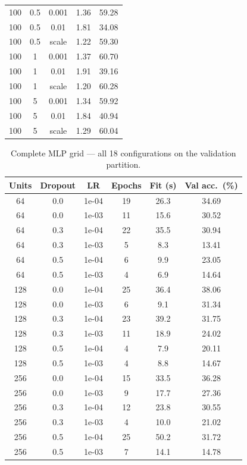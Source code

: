 \documentclass[../main.tex]{subfiles}
\begin{document}
\begin{table}[!htbp]
\begin{tabular}{ccccc}
        100 & 0.5 & 0.001 & 1.36 & 59.28 \\
        100 & 0.5 & 0.01 & 1.81 & 34.08 \\
        100 & 0.5 & scale & 1.22 & 59.30 \\
        100 & 1 & 0.001 & 1.37 & 60.70 \\
        100 & 1 & 0.01 & 1.91 & 39.16 \\
        100 & 1 & scale & 1.20 & 60.28 \\
        100 & 5 & 0.001 & 1.34 & 59.92 \\
        100 & 5 & 0.01 & 1.84 & 40.94 \\
        100 & 5 & scale & 1.29 & 60.04 \\
        \bottomrule
    \end{tabular}
\end{table}

\begin{table}[!htbp]
    \centering
    \caption{Complete MLP grid — all 18 configurations on the validation
    partition.}
    \label{tab.mlp-full}
    \begin{tabular}{cccccc}
        \toprule
        \textbf{Units} & \textbf{Dropout} & \textbf{LR} &
        \textbf{Epochs} & \textbf{Fit (s)} &
        \textbf{Val acc.\ (\%)} \\
        \midrule
        64 & 0.0 & 1e-04 & 19 & 26.3 & 34.69 \\
        64 & 0.0 & 1e-03 & 11 & 15.6 & 30.52 \\
        64 & 0.3 & 1e-04 & 22 & 35.5 & 30.94 \\
        64 & 0.3 & 1e-03 & 5 & 8.3 & 13.41 \\
        64 & 0.5 & 1e-04 & 6 & 9.9 & 23.05 \\
        64 & 0.5 & 1e-03 & 4 & 6.9 & 14.64 \\
        128 & 0.0 & 1e-04 & 25 & 36.4 & 38.06 \\
        128 & 0.0 & 1e-03 & 6 & 9.1 & 31.34 \\
        128 & 0.3 & 1e-04 & 23 & 39.2 & 31.75 \\
        128 & 0.3 & 1e-03 & 11 & 18.9 & 24.02 \\
        128 & 0.5 & 1e-04 & 4 & 7.9 & 20.11 \\
        128 & 0.5 & 1e-03 & 4 & 8.8 & 14.67 \\
        256 & 0.0 & 1e-04 & 15 & 33.5 & 36.28 \\
        256 & 0.0 & 1e-03 & 9 & 17.7 & 27.36 \\
        256 & 0.3 & 1e-04 & 12 & 23.8 & 30.55 \\
        256 & 0.3 & 1e-03 & 4 & 10.0 & 21.02 \\
        256 & 0.5 & 1e-04 & 25 & 50.2 & 31.72 \\
        256 & 0.5 & 1e-03 & 7 & 14.1 & 14.78 \\
        \bottomrule
    \end{tabular}
\end{table}
\end{document}
